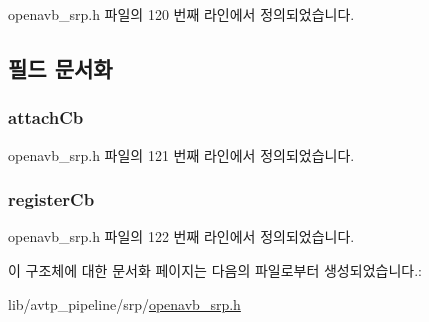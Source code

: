 openavb\+\_\+srp.\+h 파일의 120 번째 라인에서 정의되었습니다.



\subsection{필드 문서화}
\subsubsection[{\texorpdfstring{attach\+Cb}{attachCb}}]{ attach\+Cb}\hypertarget{structavtp_callbacks_a781766ada1fd0cb6a2cf5ffddf6b5ff9}{}\label{structavtp_callbacks_a781766ada1fd0cb6a2cf5ffddf6b5ff9}


openavb\+\_\+srp.\+h 파일의 121 번째 라인에서 정의되었습니다.

\subsubsection[{\texorpdfstring{register\+Cb}{registerCb}}]{ register\+Cb}\hypertarget{structavtp_callbacks_a3c076b57292d2fbf6085897c9f921a98}{}\label{structavtp_callbacks_a3c076b57292d2fbf6085897c9f921a98}


openavb\+\_\+srp.\+h 파일의 122 번째 라인에서 정의되었습니다.



이 구조체에 대한 문서화 페이지는 다음의 파일로부터 생성되었습니다.\+:\begin{DoxyCompactItemize}
\item 
lib/avtp\+\_\+pipeline/srp/\hyperlink{openavb__srp_8h}{openavb\+\_\+srp.\+h}\end{DoxyCompactItemize}
